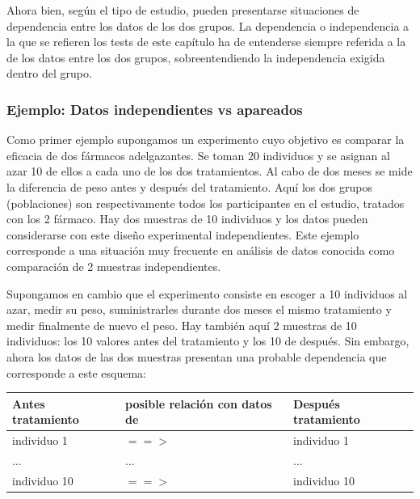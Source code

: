 \documentclass[
]{article}
\begin{document}
Ahora bien, según el tipo de estudio, pueden presentarse situaciones de dependencia entre los datos de los dos grupos. La dependencia o independencia a la que se refieren los tests de este capítulo ha de entenderse siempre referida a la de los datos entre los dos grupos, sobreentendiendo la independencia exigida dentro del grupo.

\subsubsection{Ejemplo: Datos independientes vs apareados}\label{ejemplo-datos-independientes-vs-apareados}

Como primer ejemplo supongamos un experimento cuyo objetivo es comparar la eficacia de dos fármacos adelgazantes. Se toman 20 individuos y se asignan al azar 10 de ellos a cada uno de los dos tratamientos. Al cabo de dos meses se mide la diferencia de peso antes y después del tratamiento. Aquí los dos grupos (poblaciones) son respectivamente todos los participantes en el estudio, tratados con los 2 fármaco. Hay dos muestras de 10 individuos y los datos pueden considerarse con este diseño experimental independientes. Este ejemplo corresponde a una situación muy frecuente en análisis de datos conocida como comparación de 2 muestras independientes.

Supongamos en cambio que el experimento consiste en escoger a 10 individuos al azar, medir su peso, suministrarles durante dos meses el mismo tratamiento y medir finalmente de nuevo el peso. Hay también aquí 2 muestras de 10 individuos: los 10 valores antes del tratamiento y los 10 de después. Sin embargo, ahora los datos de las dos muestras presentan una probable dependencia que corresponde a este esquema:

\begin{longtable}[]{@{}
  >{\centering\arraybackslash}p{}
  >{\centering\arraybackslash}p{}
  >{\centering\arraybackslash}p{}@{}}
\toprule\noalign{}
\begin{minipage}[b]{\linewidth}\centering
Antes tratamiento
\end{minipage} & \begin{minipage}[b]{\linewidth}\centering
posible relación con datos de
\end{minipage} & \begin{minipage}[b]{\linewidth}\centering
Después tratamiento
\end{minipage} \\
\midrule\noalign{}
\endhead
\bottomrule\noalign{}
\endlastfoot
individuo 1 & \(==>\) & individuo 1 \\
\(\ldots\) & \(\ldots\) & \(\ldots\) \\
individuo 10 & \(==>\) & individuo 10 \\
\end{longtable}
\end{document}
